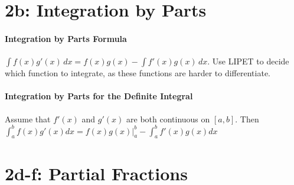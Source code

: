 \documentclass[10pt,letter]{article}
\begin{document}
\section*{2b: Integration by Parts}
\paragraph{Integration by Parts Formula}
$\int f(x)g'(x)\,dx=f(x)g(x)-\int f'(x)g(x)\,dx$. Use LIPET to decide which function to integrate, as these functions are harder to differentiate. 

\paragraph{Integration by Parts for the Definite Integral}
Assume that $f'(x)$ and $g'(x)$ are both continuous on $[a,b]$. Then $\int_a^bf(x)g'(x)dx=f(x)g(x)|_a^b-\int_a^bf'(x)g(x)dx$ 

\section*{2d-f: Partial Fractions}
\end{document}
